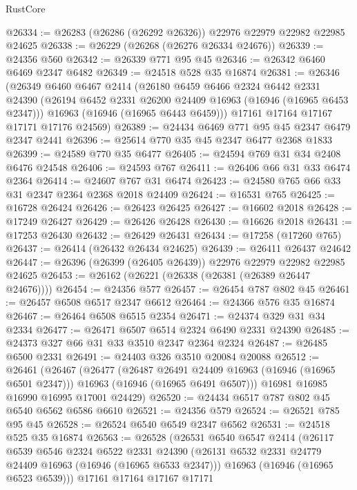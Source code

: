 \begin{lexlean}{RustCore}
\begin{coremodule}
@26334 := @26283 (@26286 (@26292 @26326)) @22976 @22979 @22982 @22985 @24625
@26338 := @26229 (@26268 (@26276 @26334 @24676))
@26339 := @24356 @560
@26342 := @26339 @771 @95 @45
@26346 := @26342 @6460 @6469 @2347 @6482
@26349 := @24518 @528 @35 @16874
@26381 := @26346
    (@26349
      @6460
      @6467
      @2414
      (@26180
        @6459
        @6466
        @2324
        @6442
        @2331
        @24390
        (@26194 @6452 @2331 @26200 @24409 @16963 (@16946 (@16965 @6453 @2347)))
        @16963
        (@16946 (@16965 @6443 @6459)))
      @17161
      @17164
      @17167
      @17171
      @17176
      @24569)
@26389 := @24434 @6469 @771 @95 @45 @2347 @6479 @2347 @2441
@26396 := @25614 @770 @35 @45 @2347 @6477 @2368 @1833
@26399 := @24589 @770 @35 @6477
@26405 := @24594 @769 @31 @34 @2408 @6476 @24548
@26406 := @24593 @767
@26411 := @26406 @66 @31 @33 @6474 @2364
@26414 := @24607 @767 @31 @6474
@26423 := @24580 @765 @66 @33 @31 @2347 @2364 @2368 @2018 @24409
@26424 := @16531 @765
@26425 := @16728 @26424
@26426 := @26423 @26425
@26427 := @16602 @2018
@26428 := @17249 @26427
@26429 := @26426 @26428
@26430 := @16626 @2018
@26431 := @17253 @26430
@26432 := @26429 @26431
@26434 := @17258 (@17260 @765)
@26437 := @26414 (@26432 @26434 @24625)
@26439 := @26411 @26437 @24642
@26447 := @26396 (@26399 (@26405 @26439)) @22976 @22979 @22982 @22985 @24625
@26453 := @26162 (@26221 (@26338 (@26381 (@26389 @26447 @24676))))
@26454 := @24356 @577
@26457 := @26454 @787 @802 @45
@26461 := @26457 @6508 @6517 @2347 @6612
@26464 := @24366 @576 @35 @16874
@26467 := @26464 @6508 @6515 @2354
@26471 := @24374 @329 @31 @34 @2334
@26477 := @26471 @6507 @6514 @2324 @6490 @2331 @24390
@26485 := @24373 @327 @66 @31 @33 @3510 @2347 @2364 @2324
@26487 := @26485 @6500 @2331
@26491 := @24403 @326 @3510 @20084 @20088
@26512 := @26461
    (@26467
      (@26477
        (@26487 @26491 @24409 @16963 (@16946 (@16965 @6501 @2347)))
        @16963
        (@16946 (@16965 @6491 @6507)))
      @16981
      @16985
      @16990
      @16995
      @17001
      @24429)
@26520 := @24434 @6517 @787 @802 @45 @6540 @6562 @6586 @6610
@26521 := @24356 @579
@26524 := @26521 @785 @95 @45
@26528 := @26524 @6540 @6549 @2347 @6562
@26531 := @24518 @525 @35 @16874
@26563 := @26528
    (@26531
      @6540
      @6547
      @2414
      (@26117
        @6539
        @6546
        @2324
        @6522
        @2331
        @24390
        (@26131 @6532 @2331 @24779 @24409 @16963 (@16946 (@16965 @6533 @2347)))
        @16963
        (@16946 (@16965 @6523 @6539)))
      @17161
      @17164
      @17167
      @17171

\end{coremodule}
\end{lexlean}
